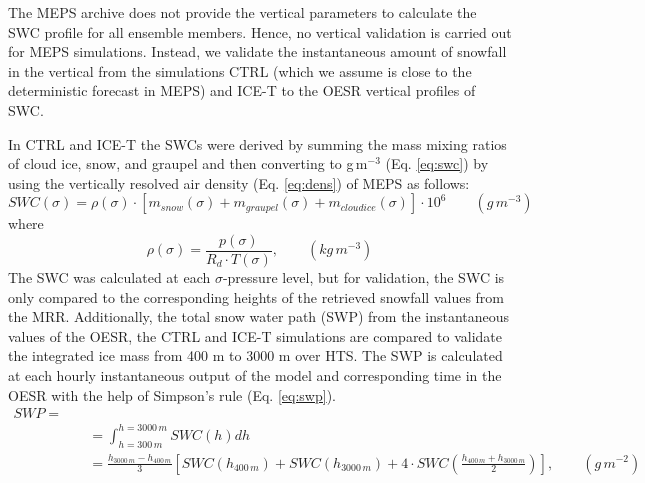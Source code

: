 \documentclass{ametsocV5}
\begin{document}
        The MEPS archive does not provide the vertical parameters to calculate the SWC profile for all ensemble members. Hence, no vertical validation is carried out for MEPS simulations. Instead, we validate the instantaneous amount of snowfall in the vertical from the simulations CTRL (which we assume is close to the deterministic forecast in MEPS) and ICE-T to the OESR vertical profiles of SWC.
        
        In CTRL and ICE-T the SWCs were derived by summing the mass mixing ratios of cloud ice, snow, and graupel and then converting to g\,m$^{-3}$ (Eq. \ref{eq:swc}) by using the vertically resolved air density (Eq. \ref{eq:dens}) of MEPS as follows:
        \begin{equation}
            SWC(\sigma) = \rho(\sigma) \cdot [m_{snow}(\sigma) + m_{graupel}(\sigma) + m_{cloud ice}(\sigma)] \cdot 10^6 \qquad (g\,m^{-3})
            \label{eq:swc}
        \end{equation}
        where
        \begin{equation}
            \rho(\sigma) = \frac{p(\sigma)}{R_d \cdot T(\sigma)}, \qquad (kg\,m^{-3})
            \label{eq:dens}
        \end{equation}
        The SWC was calculated at each $\sigma$-pressure level, but for validation, the SWC is only compared to the corresponding heights of the retrieved snowfall values from the MRR. Additionally, the total snow water path (SWP) from the instantaneous values of the OESR, the CTRL and ICE-T simulations are compared to validate the integrated ice mass from 400 m to 3000 m over HTS. The SWP is calculated at each hourly instantaneous output of the model and corresponding time in the OESR with the help of Simpson’s rule (Eq. \ref{eq:swp}).
        \begin{equation}
        	\begin{split}
	        	SWP =\\
	        	&\quad = \int_{h = 300\,m}^{h = 3000\,m} SWC(h) dh  \\
	        	&\quad = \frac{h_{3000\,m} - h_{400\,m}}{3} \left[ SWC(h_{400\,m}) + SWC(h_{3000\,m}) + 4 \cdot SWC \left( \frac{h_{400\,m} + h_{3000\,m}}{2}\right) \right], \qquad (g\,m^{-2})
	        \end{split}
            \label{eq:swp}
        \end{equation}

        


        
\end{document}
